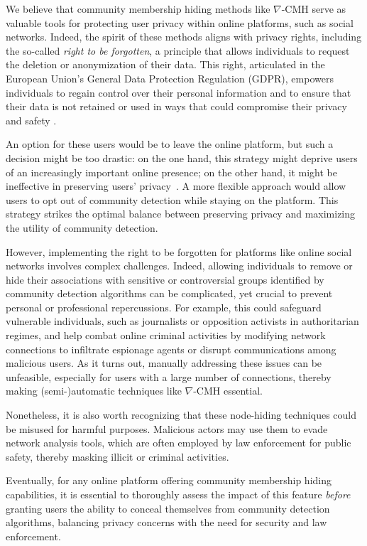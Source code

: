 We believe that community membership hiding methods like $\nabla$-CMH serve as valuable tools for protecting user privacy within online platforms, such as social networks. 
Indeed, the spirit of these methods aligns with privacy rights, including the so-called \textit{right to be forgotten}, a principle that allows individuals to request the deletion or anonymization of their data. 
This right, articulated in the European Union's General Data Protection Regulation (GDPR), empowers individuals to regain control over their personal information and to ensure that their data is not retained or used in ways that could compromise their privacy and safety \citep{regulation2016general, mantzouranis2020privacy}.

An option for these users would be to leave the online platform, but such a decision might be too drastic: on the one hand, this strategy might deprive users of an increasingly important online presence; on the other hand, it might be ineffective in preserving users' privacy~\cite{minaei2017arxiv}. A more flexible approach would allow users to opt out of community detection while staying on the platform. This strategy strikes the optimal balance between preserving privacy and maximizing the utility of community detection. 

However, implementing the right to be forgotten for platforms like online social networks involves complex challenges. Indeed, allowing individuals to remove or hide their associations with sensitive or controversial groups identified by community detection algorithms can be complicated, yet crucial to prevent personal or professional repercussions. 
For example, this could safeguard vulnerable individuals, such as journalists or opposition activists in authoritarian regimes, and help combat online criminal activities by modifying network connections to infiltrate espionage agents or disrupt communications among malicious users.
As it turns out, manually addressing these issues can be unfeasible, especially for users with a large number of connections, thereby making (semi-)automatic techniques like $\nabla$-CMH essential.

Nonetheless, it is also worth recognizing that these node-hiding techniques could be misused for harmful purposes. Malicious actors may use them to evade network analysis tools, which are often employed by law enforcement for public safety, thereby masking illicit or criminal activities.

Eventually, for any online platform offering community membership hiding capabilities, it is essential to thoroughly assess the impact of this feature \textit{before} granting users the ability to conceal themselves from community detection algorithms, balancing privacy concerns with the need for security and law enforcement.